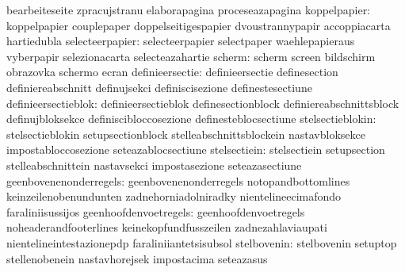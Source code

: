                                   bearbeiteseite                   zpracujstranu
                                  elaborapagina                    proceseazapagina
                    koppelpapier: koppelpapier                     couplepaper
                                  doppelseitigespapier             dvoustrannypapir
                                  accoppiacarta                    hartiedubla
                 selecteerpapier: selecteerpapier                  selectpaper
                                  waehlepapieraus                  vyberpapir
                                  selezionacarta                   selecteazahartie
                          scherm: scherm                           screen
                                  bildschirm                       obrazovka
                                  schermo                          ecran
                 definieersectie: definieersectie                  definesection
                                  definiereabschnitt               definujsekci
                                  definiscisezione                 definestesectiune
             definieersectieblok: definieersectieblok              definesectionblock
                                  definiereabschnittsblock         definujbloksekce
                                  definiscibloccosezione           definesteblocsectiune
                stelsectieblokin: stelsectieblokin                 setupsectionblock
                                  stelleabschnittsblockein         nastavbloksekce
                                  impostabloccosezione             seteazablocsectiune
                    stelsectiein: stelsectiein                     setupsection
                                  stelleabschnittein               nastavsekci
                                  impostasezione                   seteazasectiune
          geenbovenenonderregels: geenbovenenonderregels           notopandbottomlines
                                  keinzeilenobenundunten           zadnehorniadolniradky
                                  nientelineecimafondo             faraliniisussijos
           geenhoofdenvoetregels: geenhoofdenvoetregels            noheaderandfooterlines
                                  keinekopfundfusszeilen           zadnezahlaviaupati
                                  nientelineintestazionepdp        faraliniiantetsisubsol
                     stelbovenin: stelbovenin                      setuptop
                                  stellenobenein                   nastavhorejsek
                                  impostacima                      seteazasus
